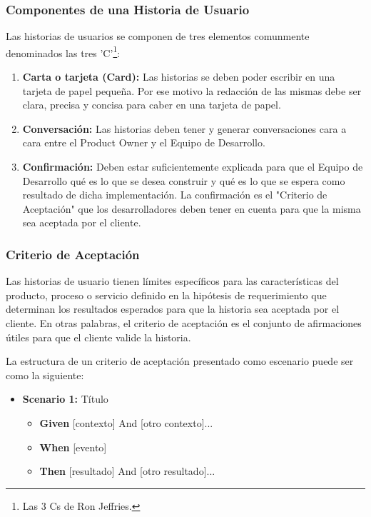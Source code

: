 \subsubsection{Componentes de una Historia de Usuario}

Las historias de usuarios se componen de tres elementos comunmente denominados las tres 'C'\footnote{Las 3 Cs de Ron Jeffries.}:

\begin{enumerate}

\item \textbf{Carta o tarjeta (Card):} Las historias se deben poder escribir en una tarjeta de papel pequeña. Por ese motivo la redacción de las mismas debe ser clara, precisa y concisa para caber en una tarjeta de papel.

\item \textbf{Conversación:} Las historias deben tener y generar conversaciones cara a cara entre el Product Owner y el Equipo de Desarrollo.

\item \textbf{Confirmación:} Deben estar suficientemente explicada para que el Equipo de Desarrollo qué es lo que se desea construir y qué es lo que se espera como resultado de dicha implementación. La confirmación es el "Criterio de Aceptación" que los desarrolladores deben tener en cuenta para que la misma sea aceptada por el cliente.

\end{enumerate}

\subsubsection{Criterio de Aceptación}

Las historias de usuario tienen límites específicos para las características del producto, proceso o servicio definido en la hipótesis de requerimiento que determinan los resultados esperados para que la historia sea aceptada por el cliente. En otras palabras, el criterio de aceptación es el conjunto de afirmaciones útiles para que el cliente valide la historia.

La estructura de un criterio de aceptación presentado como escenario puede ser como la siguiente:

\begin{itemize}
\item \textbf{Scenario 1:} Título
  \begin{itemize}
  \item \textbf{Given} [contexto] And [otro contexto]...
  \item \textbf{When}  [evento] 
  \item \textbf{Then}  [resultado] And [otro resultado]...
  \end{itemize}
\end{itemize}

